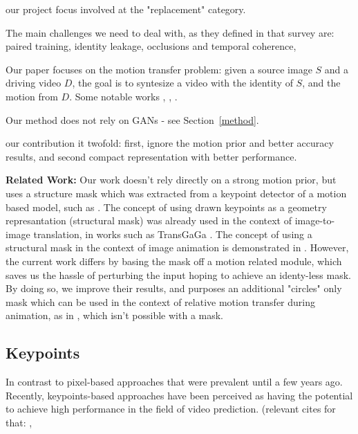 \documentclass{article}
\begin{document}
our project focus involved at the "replacement" category.

The main challenges we need to deal with, as they defined in that survey are: paired training, identity leakage, occlusions and temporal coherence,



Our paper focuses on the motion transfer problem: given a source image $S$
and a driving video $D$, the goal is to syntesize a video with the identity
of $S$, and the motion from $D$.
Some notable works \cite{siarohin2020order}, \cite{wiles2018x2face},
\cite{siarohin2019animating}.

Our method does not rely on GANs - see Section~\ref{method}.

our contribution it twofold: first, ignore the motion prior and better accuracy results, and second compact representation with better performance.

\medskip

\textbf{Related Work:} Our work doesn't rely directly on a strong motion prior,
but uses a structure mask which was extracted from a keypoint detector
of a motion based model, such as \cite{siarohin2020order}. The concept of using drawn keypoints as
a geometry represantation (structural mask) was already used in the context
of image-to-image translation, in works such as TransGaGa \cite{wu2019transgaga}.
The concept of using a structural mask in the context of image animation is
demonstrated in \cite{shalev2020image}. However, the current work differs
by basing the mask off a motion related module, which saves us the hassle
of perturbing the input hoping to achieve an identy-less mask. By doing so,
we improve their results, and purposes an additional "circles" only mask
which can be used in the context
of relative motion transfer during animation, as in
\cite{siarohin2020order}, which isn't possible with a mask.

\subsection{Keypoints}
In contrast to pixel-based approaches that were prevalent until a few years ago. Recently, keypoints-based approaches have been perceived as having the potential to achieve high performance in the field of video prediction. (relevant cites for that: \cite{kim2019unsupervised}, \cite{balakrishnan2018synthesizing} \cite{ma2017pose}  \cite{reed2017parallel} \cite{chan2019everybody} \cite{villegas2017learning}
\cite{cai2018deep}
\cite{wang2018every}
\cite{reed2015deep}
\end{document}
